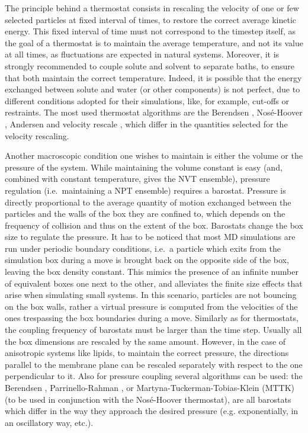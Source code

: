 The principle behind a thermostat consists in rescaling the velocity of one or few selected particles at fixed interval of times, to restore the correct average kinetic energy. This fixed interval of time must not correspond to the timestep itself, as the goal of a thermostat is to maintain the average temperature, and not its value at all times, as fluctuations are expected in natural systems.
%
Moreover, it is strongly recommended to couple solute and solvent to separate baths, to ensure that both maintain the correct temperature. Indeed, it is possible that the energy exchanged between solute and water (or other components) is not perfect, due to different conditions adopted for their simulations, like, for example, cut-offs or restraints.
%
The most used thermostat algorithms are the Berendsen \cite{Berendsen1984}, Nos\'{e}-Hoover \cite{Nose1983,Hoover1985}, Andersen \cite{Andersen1980} and velocity rescale \cite{Bussi2007}, which differ in the quantities selected for the velocity rescaling.

Another macroscopic condition one wishes to maintain is either the volume or the pressure of the system. While maintaining the volume constant is easy (and, combined with constant temperature, gives the NVT ensemble), pressure regulation (i.e.\ maintaining a NPT ensemble) requires a barostat.
%
Pressure is directly proportional to the average quantity of motion exchanged between the particles and the walls of the box they are confined to, which depends on the frequency of collision and thus on the extent of the box. Barostats change the box size to regulate the pressure.
%
It has to be noticed that most MD simulations are run under periodic boundary conditions, i.e.\ a particle which exits from the simulation box during a move is brought back on the opposite side of the box, leaving the box density constant. This mimics the presence of an infinite number of equivalent boxes one next to the other, and alleviates the finite size effects that arise when simulating small systems.
%
In this scenario, particles are not bouncing on the box walls, rather a virtual pressure is computed from the velocities of the ones trespassing the box boundaries during a move.
%
Similarly as for thermostats, the coupling frequency of barostats must be larger than the time step. Usually all the box dimensions are rescaled by the same amount. However, in the case of anisotropic systems like lipids, to maintain the correct pressure, the directions parallel to the membrane plane can be rescaled separately with respect to the one perpendicular to it.
%
Also for pressure coupling several algorithms can be used: the Berendsen \cite{Berendsen1984}, Parrinello-Rahman \cite{Parrinello1981}, or Martyna-Tuckerman-Tobias-Klein (MTTK) \cite{Martyna1996} (to be used in conjunction with the Nos\'{e}-Hoover thermostat), are all barostats which differ in the way they approach the desired pressure (e.g. exponentially, in an oscillatory way, etc.).


